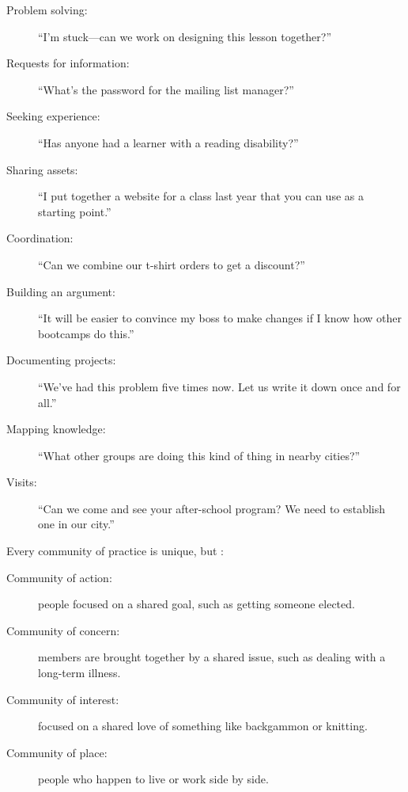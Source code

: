 \begin{description}

\item[Problem solving:]
  ``I'm stuck---can we work on designing this lesson together?''

\item[Requests for information:]
  ``What's the password for the mailing list manager?''

\item[Seeking experience:]
  ``Has anyone had a learner with a reading disability?''

\item[Sharing assets:]
  ``I put together a website for a class last year that you can use as a starting point.''

\item[Coordination:]
  ``Can we combine our t-shirt orders to get a discount?''

\item[Building an argument:]
  ``It will be easier to convince my boss to make changes if I know how other bootcamps do this.''

\item[Documenting projects:]
  ``We've had this problem five times now. Let us write it down once and for all.''

\item[Mapping knowledge:]
  ``What other groups are doing this kind of thing in nearby cities?''

\item[Visits:]
  ``Can we come and see your after-school program? We need to establish one in our city.''

\end{description}

Every community of practice is unique,
but :

\begin{description}

\item[Community of action:]
  people focused on a shared goal,
  such as getting someone elected.

\item[Community of concern:]
  members are brought together by a shared issue,
  such as dealing with a long-term illness.

\item[Community of interest:]
  focused on a shared love of something like backgammon or knitting.

\item[Community of place:]
  people who happen to live or work side by side.

\end{description}

